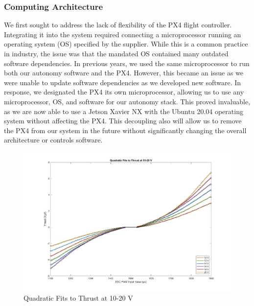 \documentclass[conference]{IEEEtran}
\begin{document}
\subsubsection{Computing Architecture}
\label{sssec:comp_arch}
We first sought to address the lack of flexibility of the PX4 flight controller. Integrating it into the system required connecting a microprocessor running an operating system (OS) specified by the supplier. While this is a common practice in industry, the issue was that the mandated OS contained many outdated software dependencies. In previous years, we used the same microprocessor to run both our autonomy software and the PX4. However, this became an issue as we were unable to update software dependencies as we developed new software. In response, we designated the PX4 its own microprocessor, allowing us to use any microprocessor, OS, and software for our autonomy stack. This proved invaluable, as we are now able to use a Jetson Xavier NX with the Ubuntu 20.04 operating system without affecting the PX4. This decoupling also will allow us to remove the PX4 from our system in the future without significantly changing the overall architecture or controls software.

\begin{figure}[htbp]
    \centerline{\includegraphics[scale=0.30]{images/motor_profile.png}}
    \caption{Quadratic Fits to Thrust at 10-20 V}
    \label{fig:motor_profile}
\end{figure}
\end{document}
